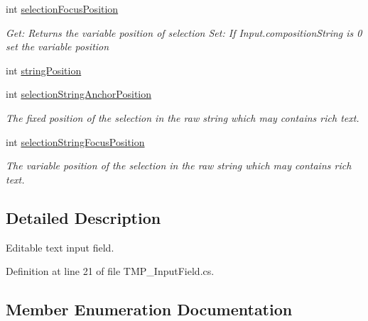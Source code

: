 \begin{DoxyCompactItemize}
int \mbox{\hyperlink{class_t_m_pro_1_1_t_m_p___input_field_a93771e08f4ee7c293af4ebc1e5bc0d9a}{selection\+Focus\+Position}}
\begin{DoxyCompactList}\small\item\em Get\+: Returns the variable position of selection Set\+: If Input.\+composition\+String is 0 set the variable position \end{DoxyCompactList}\item 
int \mbox{\hyperlink{class_t_m_pro_1_1_t_m_p___input_field_a50c68e4085013bd06441947658e90317}{string\+Position}}
\item 
int \mbox{\hyperlink{class_t_m_pro_1_1_t_m_p___input_field_ac36ae4cd4a58fa36661b49928217875e}{selection\+String\+Anchor\+Position}}
\begin{DoxyCompactList}\small\item\em The fixed position of the selection in the raw string which may contains rich text. \end{DoxyCompactList}\item 
int \mbox{\hyperlink{class_t_m_pro_1_1_t_m_p___input_field_abfe0c449ec61505b163eb5949a09f9ff}{selection\+String\+Focus\+Position}}
\begin{DoxyCompactList}\small\item\em The variable position of the selection in the raw string which may contains rich text. \end{DoxyCompactList}\end{DoxyCompactItemize}


\subsection{Detailed Description}
Editable text input field. 



Definition at line 21 of file T\+M\+P\+\_\+\+Input\+Field.\+cs.



\subsection{Member Enumeration Documentation}
\mbox{\label{class_t_m_pro_1_1_t_m_p___input_field_a96ac8b8cc04492aadbf24839b8d6376e}} 
